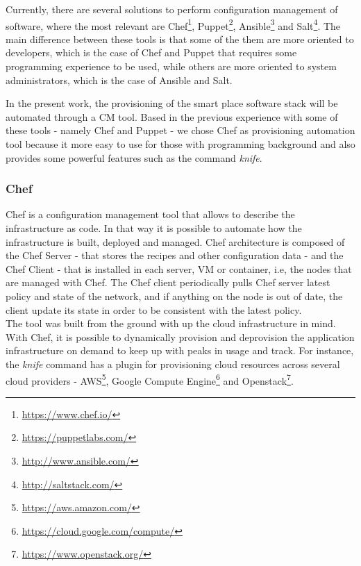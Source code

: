 Currently, there are several solutions to perform configuration management of software, where the
most relevant are Chef\footnote{\url{https://www.chef.io/}}, Puppet\footnote{\url{https://puppetlabs.com/}},
Ansible\footnote{\url{http://www.ansible.com/}} and Salt\footnote{\url{http://saltstack.com/}}. The main difference
between these tools is that some of the them are more oriented to developers, which is the case of Chef and
Puppet that requires some programming experience to be used, while others are more oriented to system
administrators, which is the case of Ansible and Salt.

In the present work, the provisioning of the smart place software stack will be automated through
a \gls{CM} tool. Based in the previous experience with some of these tools - namely Chef and Puppet -
we chose Chef as provisioning automation tool because it more easy to use for those with programming
background and also provides some powerful features such as the command \textit{knife}.

\subsubsection{Chef}
\label{subs:chef}
Chef is a configuration management tool that allows to describe the infrastructure as code.
In that way it is possible to automate how the infrastructure is built, deployed and managed.
Chef architecture is composed of the Chef Server - that stores the recipes and other configuration
data - and the Chef Client - that is installed in each server, \gls{VM} or container, i.e, the nodes that
are managed with Chef. The Chef client periodically pulls Chef server latest policy and state of the
network, and if anything on the node is out of date, the client update its state in order to be
consistent with the latest policy.\\

The tool was built from the ground with up the cloud infrastructure in mind. With Chef, it is possible
to dynamically provision and deprovision the application infrastructure on demand to keep up with
peaks in usage and track. For instance, the \textit{knife} command has a plugin for provisioning cloud
resources across several cloud providers - \gls{AWS}\footnote{\url{https://aws.amazon.com/}}, Google
Compute Engine\footnote{\url{https://cloud.google.com/compute/}} and Openstack\footnote{\url{https://www.openstack.org/}}.\\

